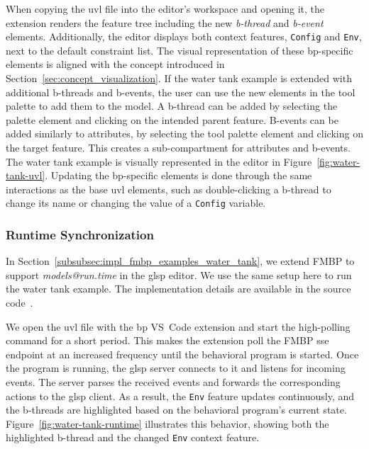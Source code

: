 When copying the \gls{uvl} file into the editor's workspace and opening it, the extension renders the feature tree including the new \textit{b-thread} and \textit{b-event} elements.
Additionally, the editor displays both context features, \texttt{Config} and \texttt{Env}, next to the default constraint list.
The visual representation of these \gls{bp}-specific elements is aligned with the concept introduced in Section~\ref{sec:concept_visualization}.
If the water tank example is extended with additional b-threads and b-events, the user can use the new elements in the tool palette to add them to the model.
A b-thread can be added by selecting the palette element and clicking on the intended parent feature.
B-events can be added similarly to attributes, by selecting the tool palette element and clicking on the target feature.
This creates a sub-compartment for attributes and b-events.
The water tank example is visually represented in the editor in Figure~\ref{fig:water-tank-uvl}.
Updating the \gls{bp}-specific elements is done through the same interactions as the base \gls{uvl} elements, such as double-clicking a b-thread to change its name or changing the value of a \texttt{Config} variable.

\subsubsection{Runtime Synchronization}
\label{subsubsec:eval_examples_water_tank_runtime}

In Section~\ref{subsubsec:impl_fmbp_examples_water_tank}, we extend FMBP to support \textit{models@run.time} in the \gls{glsp} editor.
We use the same setup here to run the water tank example.
The implementation details are available in the source code~\cite{ruider_xxnicksdaxxfmbp-sse_2026}.

We open the \gls{uvl} file with the \gls{bp} VS~Code extension and start the high-polling command for a short period.
This makes the extension poll the FMBP \gls{sse} endpoint at an increased frequency until the behavioral program is started.
Once the program is running, the \gls{glsp} server connects to it and listens for incoming events.
The server parses the received events and forwards the corresponding actions to the \gls{glsp} client.
As a result, the \texttt{Env} feature updates continuously, and the b-threads are highlighted based on the behavioral program's current state.
Figure~\ref{fig:water-tank-runtime} illustrates this behavior, showing both the highlighted b-thread and the changed \texttt{Env} context feature.

